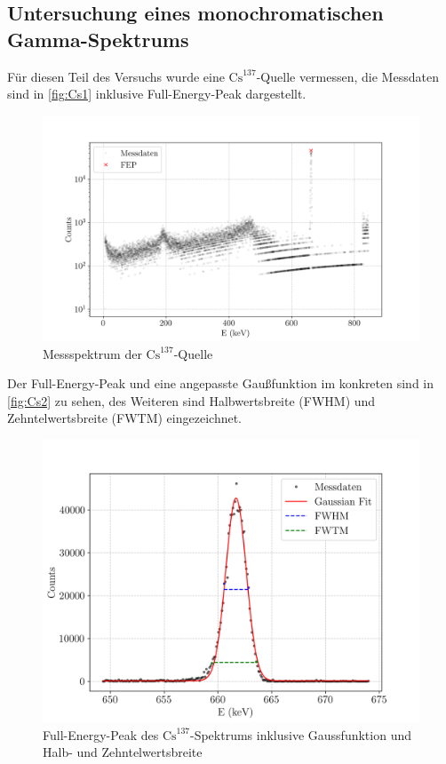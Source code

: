 \subsection{Untersuchung eines monochromatischen Gamma-Spektrums}
Für diesen Teil des Versuchs wurde eine $\text{Cs}^{137}$-Quelle vermessen, die Messdaten sind in \autoref{fig:Cs1} inklusive Full-Energy-Peak dargestellt.
\begin{figure}[H]
  \centering
  \includegraphics[scale=0.65]{Skripte/137Caesium_original.png}
  \caption{Messspektrum der $\text{Cs}^{137}$-Quelle}
  \label{fig:Cs1}
\end{figure}
Der Full-Energy-Peak und eine angepasste Gaußfunktion im konkreten sind in \autoref{fig:Cs2} zu sehen, des Weiteren sind Halbwertsbreite (FWHM) und Zehntelwertsbreite (FWTM) eingezeichnet.
\begin{figure}[H]
  \centering
  \includegraphics[scale=0.65]{Skripte/137Caesium_with_Gaussian.png}
  \caption{Full-Energy-Peak des $\text{Cs}^{137}$-Spektrums inklusive Gaussfunktion und Halb- und Zehntelwertsbreite}
  \label{fig:Cs2}
\end{figure}
